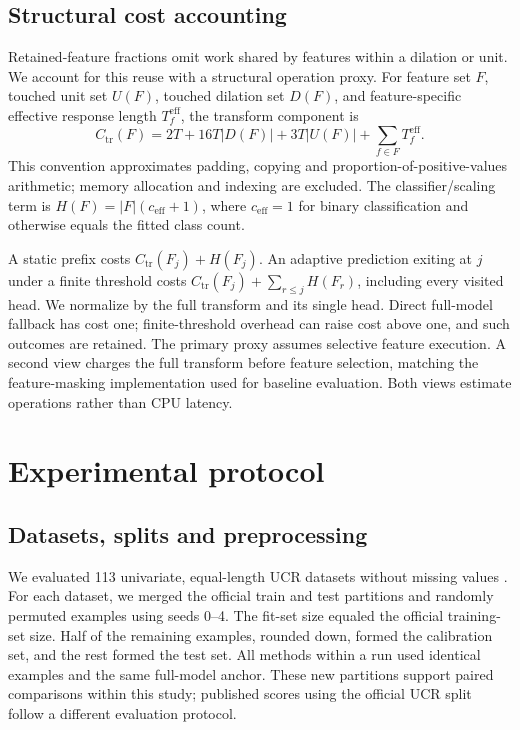 \documentclass[pdflatex,sn-basic,Numbered]{sn-jnl}
\begin{document}
\subsection{Structural cost accounting}\label{sec:cost}
Retained-feature fractions omit work shared by features within a dilation or unit. We account for this reuse with a structural operation proxy. For feature set $F$, touched unit set $U(F)$, touched dilation set $D(F)$, and feature-specific effective response length $T_f^{\mathrm{eff}}$, the transform component is
\begin{equation}
 C_{\mathrm{tr}}(F)=2T+16T|D(F)|+3T|U(F)|+\sum_{f\in F}T_f^{\mathrm{eff}}.\label{eq:cost}
\end{equation}
This convention approximates padding, copying and proportion-of-positive-values arithmetic; memory allocation and indexing are excluded. The classifier/scaling term is $H(F)=|F|(c_{\mathrm{eff}}+1)$, where $c_{\mathrm{eff}}=1$ for binary classification and otherwise equals the fitted class count.

A static prefix costs $C_{\mathrm{tr}}(F_j)+H(F_j)$. An adaptive prediction exiting at $j$ under a finite threshold costs $C_{\mathrm{tr}}(F_j)+\sum_{r\le j}H(F_r)$, including every visited head. We normalize by the full transform and its single head. Direct full-model fallback has cost one; finite-threshold overhead can raise cost above one, and such outcomes are retained. The primary proxy assumes selective feature execution. A second view charges the full transform before feature selection, matching the feature-masking implementation used for baseline evaluation. Both views estimate operations rather than CPU latency.

\section{Experimental protocol}\label{sec:protocol}
\subsection{Datasets, splits and preprocessing}
We evaluated 113 univariate, equal-length UCR datasets without missing values \cite{ucr}. For each dataset, we merged the official train and test partitions and randomly permuted examples using seeds 0--4. The fit-set size equaled the official training-set size. Half of the remaining examples, rounded down, formed the calibration set, and the rest formed the test set. All methods within a run used identical examples and the same full-model anchor. These new partitions support paired comparisons within this study; published scores using the official UCR split follow a different evaluation protocol.
\end{document}
